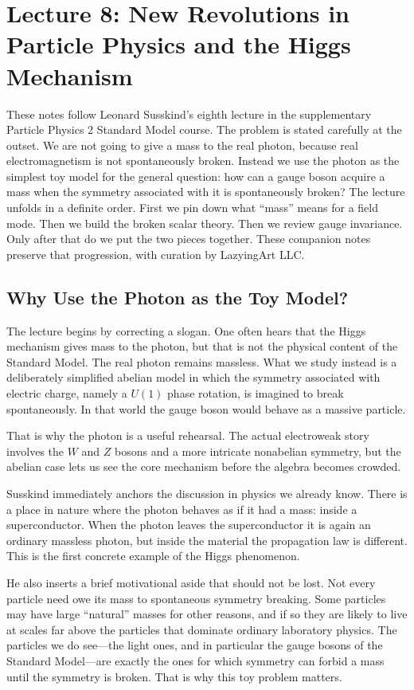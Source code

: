 \chapter{Lecture 8: New Revolutions in Particle Physics and the Higgs Mechanism}

These notes follow Leonard Susskind's eighth lecture in the supplementary Particle Physics 2 Standard Model course. The problem is stated carefully at the outset. We are not going to give a mass to the real photon, because real electromagnetism is not spontaneously broken. Instead we use the photon as the simplest toy model for the general question: how can a gauge boson acquire a mass when the symmetry associated with it is spontaneously broken? The lecture unfolds in a definite order. First we pin down what ``mass'' means for a field mode. Then we build the broken scalar theory. Then we review gauge invariance. Only after that do we put the two pieces together. These companion notes preserve that progression, with curation by LazyingArt LLC.

\section{Why Use the Photon as the Toy Model?}

The lecture begins by correcting a slogan. One often hears that the Higgs mechanism gives mass to the photon, but that is not the physical content of the Standard Model. The real photon remains massless. What we study instead is a deliberately simplified abelian model in which the symmetry associated with electric charge, namely a \(U(1)\) phase rotation, is imagined to break spontaneously. In that world the gauge boson would behave as a massive particle.

That is why the photon is a useful rehearsal. The actual electroweak story involves the \(W\) and \(Z\) bosons and a more intricate nonabelian symmetry, but the abelian case lets us see the core mechanism before the algebra becomes crowded.

Susskind immediately anchors the discussion in physics we already know. There is a place in nature where the photon behaves as if it had a mass: inside a superconductor. When the photon leaves the superconductor it is again an ordinary massless photon, but inside the material the propagation law is different. This is the first concrete example of the Higgs phenomenon.

He also inserts a brief motivational aside that should not be lost. Not every particle need owe its mass to spontaneous symmetry breaking. Some particles may have large ``natural'' masses for other reasons, and if so they are likely to live at scales far above the particles that dominate ordinary laboratory physics. The particles we do see---the light ones, and in particular the gauge bosons of the Standard Model---are exactly the ones for which symmetry can forbid a mass until the symmetry is broken. That is why this toy problem matters.


